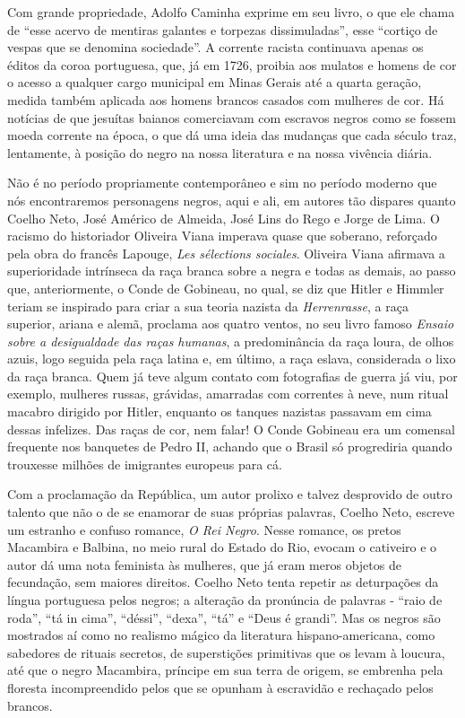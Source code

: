 \documentclass[
  letterpaper,
  DIV=11,
  numbers=noendperiod]{scrreprt}
\begin{document}
Com grande propriedade, Adolfo Caminha exprime em seu livro, o que ele
chama de ``esse acervo de mentiras galantes e torpezas dissimuladas'',
esse ``cortiço de vespas que se denomina sociedade''. A corrente racista
continuava apenas os éditos da coroa portuguesa, que, já em 1726,
proibia aos mulatos e homens de cor o acesso a qualquer cargo municipal
em Minas Gerais até a quarta geração, medida também aplicada aos homens
brancos casados com mulheres de cor. Há notícias de que jesuítas baianos
comerciavam com escravos negros como se fossem moeda corrente na época,
o que dá uma ideia das mudanças que cada século traz, lentamente, à
posição do negro na nossa literatura e na nossa vivência diária.

Não é no período propriamente contemporâneo e sim no período moderno que
nós encontraremos personagens negros, aqui e ali, em autores tão
dispares quanto Coelho Neto, José Américo de Almeida, José Lins do Rego
e Jorge de Lima. O racismo do historiador Oliveira Viana imperava quase
que soberano, reforçado pela obra do francês Lapouge, \emph{Les
sélections sociales}. Oliveira Viana afirmava a superioridade intrínseca
da raça branca sobre a negra e todas as demais, ao passo que,
anteriormente, o Conde de Gobineau, no qual, se diz que Hitler e Himmler
teriam se inspirado para criar a sua teoria nazista da
\emph{Herrenrasse}, a raça superior, ariana e alemã, proclama aos quatro
ventos, no seu livro famoso \emph{Ensaio sobre a desigualdade das raças
humanas}, a predominância da raça loura, de olhos azuis, logo seguida
pela raça latina e, em último, a raça eslava, considerada o lixo da raça
branca. Quem já teve algum contato com fotografias de guerra já viu, por
exemplo, mulheres russas, grávidas, amarradas com correntes à neve, num
ritual macabro dirigido por Hitler, enquanto os tanques nazistas
passavam em cima dessas infelizes. Das raças de cor, nem falar! O Conde
Gobineau era um comensal frequente nos banquetes de Pedro II, achando
que o Brasil só progrediria quando trouxesse milhões de imigrantes
europeus para cá.

Com a proclamação da República, um autor prolixo e talvez desprovido de
outro talento que não o de se enamorar de suas próprias palavras, Coelho
Neto, escreve um estranho e confuso romance, \emph{O Rei Negro}. Nesse
romance, os pretos Macambira e Balbina, no meio rural do Estado do Rio,
evocam o cativeiro e o autor dá uma nota feminista às mulheres, que já
eram meros objetos de fecundação, sem maiores direitos. Coelho Neto
tenta repetir as deturpações da língua portuguesa pelos negros; a
alteração da pronúncia de palavras - ``raio de roda'', ``tá in cima'',
``déssi'', ``dexa'', ``tá'' e ``Deus é grandi''. Mas os negros são
mostrados aí como no realismo mágico da literatura hispano-americana,
como sabedores de rituais secretos, de superstições primitivas que os
levam à loucura, até que o negro Macambira, príncipe em sua terra de
origem, se embrenha pela floresta incompreendido pelos que se opunham à
escravidão e rechaçado pelos brancos.
\end{document}
